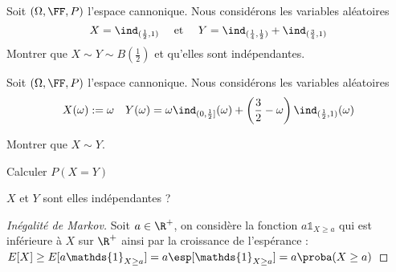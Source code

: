 \documentclass{report}
\begin{document}
\begin{exo}
    Soit \(\left(\Omega,\FF, P\right)\) l'espace cannonique. Nous considérons
    les variables aléatoires \[X=\ind_{(\frac12, 1)}\quad\text{ et }\quad
    Y=\ind_{(\frac14,\frac12)} + \ind_{(\frac34, 1)}\] Montrer que \(X\sim Y
    \sim B(\frac12)\) et qu'elles sont indépendantes.
\end{exo}

\begin{exo}
    Soit \(\left(\Omega,\FF, P\right)\) l'espace cannonique. Nous considérons
    les variables aléatoires \[X(\omega):=\omega\quad Y(\omega)=
    \omega\ind_{(0,\frac12]}(\omega)+\left(\frac32-\omega\right)
    \ind_{(\frac12, 1)}(\omega)\]
    \begin{q}{1}
        Montrer que \(X\sim Y\).

    \end{q}
    \begin{q}{2}
        Calculer \(P(X=Y)\)
    \end{q}
    \begin{q}{3}
        \(X\) et \(Y\) sont elles indépendantes ?
    \end{q}
\end{exo}


\begin{proof}[Inégalité de Markov]
    Soit \(a\in\R^+\), on considère la fonction \(a\mathds{1}_{X\geq a}\)
    qui est inférieure à \(X\) sur \(\R^+\) ainsi par la croissance de l'espérance :
    \(E[X]\geq E[a\mathds{1}_{X\geq a}] = a\esp[\mathds{1}_{X\geq a}] = a\proba(X\geq a)\)
\end{proof}
\end{document}
